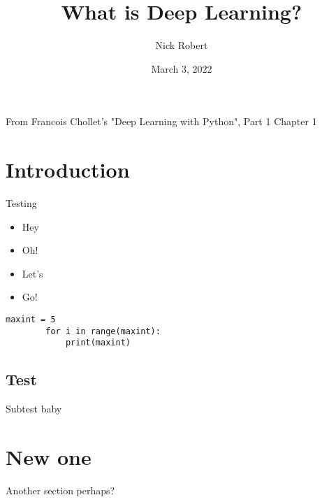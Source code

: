\documentclass[10pt]{article}
\title{What is Deep Learning?}
\author{Nick Robert}
\date{March 3, 2022}
\begin{document}
\maketitle
From Francois Chollet's "Deep Learning with Python", Part 1 Chapter 1
\section{Introduction}
    Testing
    \begin{itemize}
        \item Hey
        \item Oh!
        \item Let’s
        \item Go!
    \end{itemize}

    \begin{lstlisting}[frame=single, framerule=0pt]
        maxint = 5
        for i in range(maxint):
            print(maxint)
    \end{lstlisting}

    \subsection{Test}
        Subtest baby

\section{New one}
    Another section perhaps?
\end{document}
